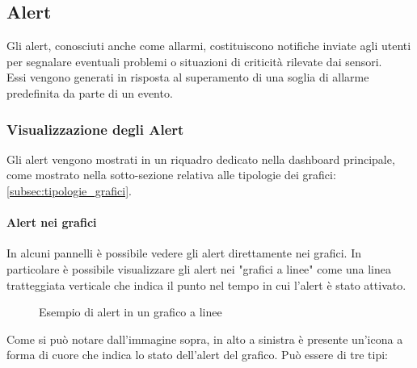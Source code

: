 \subsection{Alert}
Gli alert, conosciuti anche come allarmi, costituiscono notifiche inviate agli utenti per segnalare eventuali problemi o situazioni di criticità rilevate dai sensori.\\
Essi vengono generati in risposta al superamento di una soglia di allarme predefinita da parte di un evento.\\

\subsubsection{Visualizzazione degli Alert}
Gli alert vengono mostrati in un riquadro dedicato nella dashboard principale, come mostrato nella sotto-sezione relativa alle tipologie dei grafici: \ref{subsec:tipologie_grafici}.\\

\paragraph{Alert nei grafici}
In alcuni pannelli è possibile vedere gli alert direttamente nei grafici. In particolare è possibile visualizzare gli alert nei "grafici a linee" come una linea tratteggiata verticale che indica il punto nel tempo in cui l'alert è stato attivato.\\
\begin{figure}[H]
    \centering
    \caption{Esempio di alert in un grafico a linee}
    \label{fig:my_label}
\end{figure}
Come si può notare dall'immagine sopra, in alto a sinistra è presente un'icona a forma di cuore che indica lo stato dell'alert del grafico. Può essere di tre tipi:

